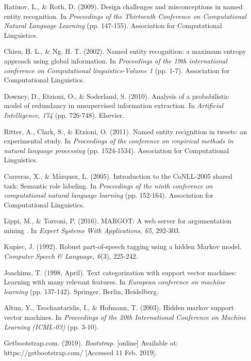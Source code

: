 \documentclass[12pt,a4paper]{article}
\begin{document}
\begin{thebibliography}{9}
  Ratinov, L., \& Roth, D. (2009). Design challenges and misconceptions in named entity recognition. In \textit{Proceedings of the Thirteenth Conference on Computational Natural Language Learning} (pp. 147-155). Association for Computational Linguistics.
  
  Chieu, H. L., \& Ng. H. T. (2002). Named entity recognition: a maximum entropy approach using global information. In \textit{Proceedings of the 19th international conference on Computational linguistics-Volume 1} (pp. 1-7). Association for Computational Linguistics.
  
  Downey, D., Etzioni, O., \& Soderland, S. (2010). Analysis of a probabilistic model of redundancy in unsupervised information extraction. In \textit{Artificial Intelligence, 174} (pp. 726-748). Elsevier.

  Ritter, A., Clark, S., \& Etzioni, O. (2011).
  Named entity recignition in tweets: an experimental study. In \textit{Proceedings of the conference on empirical methods in natural language processing} (pp. 1524-1534). Association for Computational Linguistics.
  
  Carreras, X., \& Màrquez, L. (2005). Introduction to the CoNLL-2005 shared task: Semantic role labeling. In \textit{Proceedings of the ninth conference on computational natural language learning} (pp. 152-164). Association for Computational Linguistics.
  
  Lippi, M., \& Torroni, P. (2016). MARGOT: A web server for argumentation mining . In \textit{Expert Systems With Applications, 65}, 292-303.
  
  Kupiec, J. (1992). Robust part-of-speech tagging using a hidden Markov model. \textit{Computer Speech \& Language, 6}(3), 225-242.

  Joachims, T. (1998, April). Text categorization with support vector machines: Learning with many relevant features. In \textit{European conference on machine learning} (pp. 137-142). Springer, Berlin, Heidelberg.
  
  Altun, Y., Tsochantaridis, I., \& Hofmann, T. (2003). Hidden markov support vector machines. In \textit{Proceedings of the 20th International Conference on Machine Learning (ICML-03)} (pp. 3-10).
  
  Getbootstrap.com. (2019). \textit{Bootstrap}. [online] Available at: https://getbootstrap.com/ [Accessed 11 Feb. 2019].


\end{thebibliography}
\end{document}
